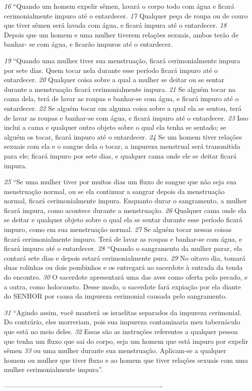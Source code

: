 \bigskip
\textit{\tiny 16}
“Quando um homem expelir sêmen, lavará o corpo todo com água e ficará
cerimonialmente impuro até o entardecer. 
\textit{\tiny 17}
Qualquer peça de roupa ou de couro
que tiver sêmen será lavada com água, e ficará impura até o entardecer. 
\textit{\tiny 18}
Depois
que um homem e uma mulher tiverem relações sexuais, ambos terão de banhar-
se com água, e ficarão impuros até o entardecer.
   
\bigskip
\textit{\tiny 19}
“Quando uma mulher tiver sua menstruação, ficará cerimonialmente impura
por sete dias. Quem tocar nela durante esse período ficará impuro até o
entardecer. 
\textit{\tiny 20}
Qualquer coisa sobre a qual a mulher se deitar ou se sentar durante
a menstruação ficará cerimonialmente impura. 
\textit{\tiny 21}
Se alguém tocar na cama dela,
terá de lavar as roupas e banhar-se com água, e ficará impuro até o entardecer.
\textit{\tiny 22}
Se alguém tocar em alguma coisa sobre a qual ela se sentou, terá de lavar as
roupas e banhar-se com água, e ficará impuro até o entardecer. 
\textit{\tiny 23}
Isso inclui a
cama e qualquer outro objeto sobre o qual ela tenha se sentado; se alguém os
tocar, ficará impuro até o entardecer. 
\textit{\tiny 24}
Se um homem tiver relações sexuais com
ela e o sangue dela o tocar, a impureza menstrual será transmitida para ele; ficará
impuro por sete dias, e qualquer cama onde ele se deitar ficará impura.
   
\bigskip
\textit{\tiny 25}
“Se uma mulher tiver por muitos dias um fluxo de sangue que não seja sua
menstruação normal, ou se ela continuar a sangrar depois da menstruação
normal, ficará cerimonialmente impura. Enquanto durar o sangramento, a mulher
ficará impura, como acontece durante a menstruação. 
\textit{\tiny 26}
Qualquer cama onde ela
se deitar e qualquer objeto sobre o qual ela se sentar durante esse período ficará
impuro, como em sua menstruação normal. 
\textit{\tiny 27}
Se alguém tocar nessas coisas
ficará cerimonialmente impuro. Terá de lavar as roupas e banhar-se com água, e
ficará impuro até o entardecer.
\textit{\tiny 28}
“Quando o sangramento da mulher parar, ela contará sete dias e depois
estará cerimonialmente pura. 
\textit{\tiny 29}
No oitavo dia, tomará duas rolinhas ou dois
pombinhos e os entregará ao sacerdote à entrada da tenda do encontro. 
\textit{\tiny 30}
O
sacerdote apresentará uma das aves como oferta pelo pecado, e a outra, como
holocausto. Desse modo, o sacerdote fará expiação por ela diante do SENHOR por
causa da impureza cerimonial causada pelo sangramento.

\smallskip
\textit{\tiny 31}
“Agindo assim, você manterá os israelitas separados da impureza cerimonial.
Do contrário, eles morreriam, pois sua impureza contaminaria meu tabernáculo
que está no meio deles. 
\textit{\tiny 32}
Essas são as instruções referentes a qualquer pessoa
que tenha um fluxo que sai do corpo, seja um homem que está impuro por expelir
sêmen 
\textit{\tiny 33}
ou uma mulher durante sua menstruação. Aplicam-se a qualquer
homem ou mulher que tiver fluxo e ao homem que tiver relações sexuais com
uma mulher cerimonialmente impura”.

----------------------------------------------------------------------

